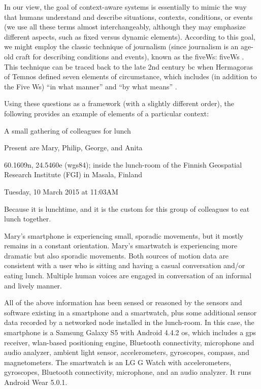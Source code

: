 In our view, the goal of context-aware systems is essentially to mimic the way that humans understand and describe situations, contexts, conditions, or events (we use all these terms almost interchangeably, although they may emphasize different aspects, such as fixed versus dynamic elements). According to this goal, we might employ the classic technique of journalism (since journalism is an age-old craft for describing conditions and events), known as the \acrshort{fiveWs}: \acrlong{fiveWs} . This technique can be traced back to the late 2nd century \acrshort{bc} when Hermagoras of Temnos defined seven elements of circumstance, which includes (in addition to the Five Ws) ``in what manner'' and ``by what means'' \cite{bennett2005hermagoras}.

Using these questions as a framework (with a slightly different order), the following provides an example of elements of a particular context:
%
\begin{bold_description}
\item[What:]A small gathering of colleagues for lunch
\item[Who:] Present are Mary, Philip, George, and Anita
\item[Where:]60.1609\textdegree{}\acrshort{n}, 24.5460\textdegree{}\acrshort{e} (\acrshort{wgs84}); inside the lunch-room of the Finnish Geospatial Research Institute (FGI) in Masala, Finland
\item[When:]Tuesday, 10 March 2015 at 11:03AM
\item[Why:]Because it is lunchtime, and it is the custom for this group of colleagues to eat lunch together.
\item[In What Manner:] Mary's smartphone is experiencing small, sporadic movements, but it mostly remains in a constant orientation. Mary's smartwatch is experiencing more dramatic but also sporadic movements. Both sources of motion data are consistent with a user who is sitting and having a casual conversation and/or eating lunch. Multiple human voices are engaged in conversation of an informal and lively manner.
\item[By What Means:]All of the above information has been sensed or reasoned by the sensors and software existing in a smartphone and a smartwatch, plus some additional sensor data recorded by a networked node installed in the lunch-room. In this case, the smartphone is a Samsung Galaxy S5 with Android 4.4.2 \gls{os}, which includes a \gls{gps} receiver, \acrshort{wlan}-based positioning engine, Bluetooth connectivity, microphone and audio analyzer, ambient light sensor, accelerometers, gyroscopes, compass, and magnetometers. The smartwatch is an LG G Watch with accelerometers, gyroscopes, Bluetooth connectivity, microphone, and an audio analyzer. It runs Android Wear 5.0.1.
\end{bold_description}

